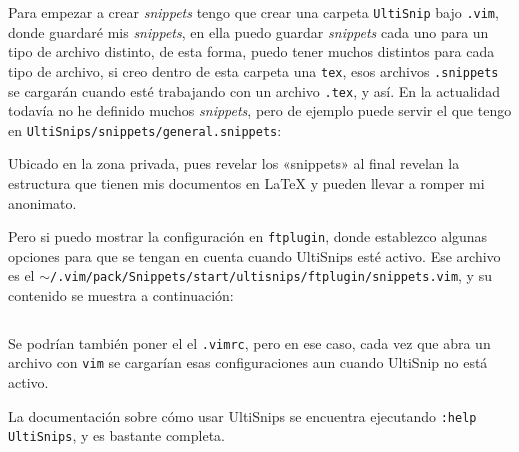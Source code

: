 \documentclass{article}
\begin{document}
    Para empezar a crear \textit{snippets} tengo que crear una carpeta \texttt{UltiSnip} bajo \texttt{.vim}, donde guardaré mis \textit{snippets}, en ella puedo guardar \textit{snippets} cada uno para un tipo de archivo distinto, de esta forma, puedo tener muchos distintos para cada tipo de archivo, si creo dentro de esta carpeta una \texttt{tex}, esos archivos \texttt{.snippets} se cargarán cuando esté trabajando con un archivo \texttt{.tex}, y así. En la actualidad todavía no he definido muchos \textit{snippets}, pero de ejemplo puede servir el que tengo en \texttt{UltiSnips/snippets/general.snippets}:

    Ubicado en la zona privada, pues revelar los «snippets» al final revelan la
    estructura que tienen mis documentos en \LaTeX{} y pueden llevar a romper mi
    anonimato.

    Pero si puedo mostrar la configuración en \texttt{ftplugin}, donde
    establezco algunas opciones para que se tengan en cuenta cuando UltiSnips
    esté activo. Ese archivo es el \texttt{$\sim$/.vim/pack/Snippets/start/ultisnips/ftplugin/snippets.vim},
    y su contenido se muestra a continuación:

    \inputminted[breaklines, breakanywhere, breaksymbolleft="", breaksymbolright="", breakanywheresymbolpre="", breakanywheresymbolpost=""]
    {vim}{inc/snippets.vim}

    Se podrían también poner el el \texttt{.vimrc}, pero en ese caso, cada
    vez que abra un archivo con \texttt{vim} se cargarían esas configuraciones
    aun cuando UltiSnip no está activo.

    La documentación sobre cómo usar UltiSnips se encuentra ejecutando \texttt{:help UltiSnips}, y es bastante completa.
\end{document}
